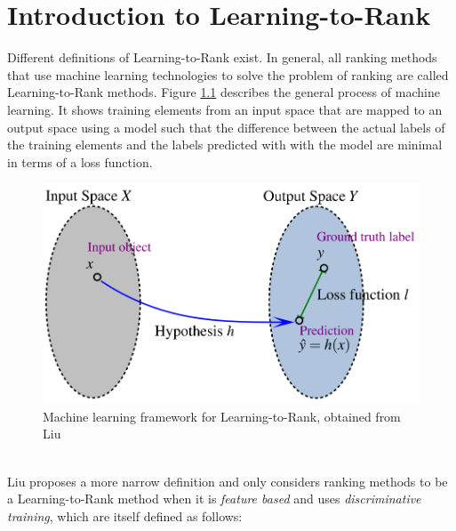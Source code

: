 \chapter{Introduction to Learning-to-Rank}
Different definitions of Learning-to-Rank exist. In general, all ranking methods that use machine learning technologies to solve the problem of ranking are called Learning-to-Rank methods. Figure \ref{fig:discriminative_training} describes the general process of machine learning. It shows training elements from an input space that are mapped to an output space using a model such that the difference between the actual labels of the training elements and the labels predicted with with the model are minimal in terms of a loss function.
\begin{figure}[!h]
\includegraphics[scale=0.26]{gfx/descriminative_training}
\caption{Machine learning framework for Learning-to-Rank, obtained from Liu\cite{Liu2007}}
\label{fig:discriminative_training}
\end{figure}\\
Liu \cite{Liu2007} proposes a more narrow definition and only considers ranking methods to be a Learning-to-Rank method when it is \emph{feature based} and uses \emph{discriminative training}, which are itself defined as follows:
